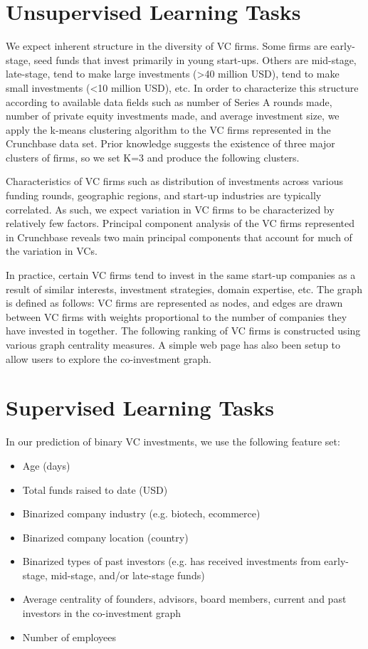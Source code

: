 \documentclass{article}
\begin{document}
\section{Unsupervised Learning Tasks}

We expect inherent structure in the diversity of VC firms. Some firms are early-stage, seed funds that invest primarily in young start-ups. Others are mid-stage, late-stage, tend to make large investments (>40 million USD), tend to make small investments (<10 million USD), etc. In order to characterize this structure according to available data fields such as number of Series A rounds made, number of private equity investments made, and average investment size, we apply the k-means clustering algorithm to the VC firms represented in the Crunchbase data set. Prior knowledge suggests the existence of three major clusters of firms, so we set K=3 and produce the following clusters.

Characteristics of VC firms such as distribution of investments across various funding rounds, geographic regions, and start-up industries are typically correlated. As such, we expect variation in VC firms to be characterized by relatively few factors. Principal component analysis of the VC firms represented in Crunchbase reveals two main principal components that account for much of the variation in VCs.

In practice, certain VC firms tend to invest in the same start-up companies as a result of similar interests, investment strategies, domain expertise, etc. The graph is defined as follows: VC firms are represented as nodes, and edges are drawn between VC firms with weights proportional to the number of companies they have invested in together. The following ranking of VC firms is constructed using various graph centrality measures. A simple web page has also been setup to allow users to explore the co-investment graph.

\section{Supervised Learning Tasks}

In our prediction of binary VC investments, we use the following feature set:
\begin{itemize}
\item{Age (days)}
\item{Total funds raised to date (USD)}
\item{Binarized company industry (e.g. biotech, ecommerce)}
\item{Binarized company location (country)}
\item{Binarized types of past investors (e.g. has received investments from early-stage, mid-stage, and/or late-stage funds)}
\item{Average centrality of founders, advisors, board members, current and past investors in the co-investment graph}
\item{Number of employees}
\end{itemize}
\end{document}

